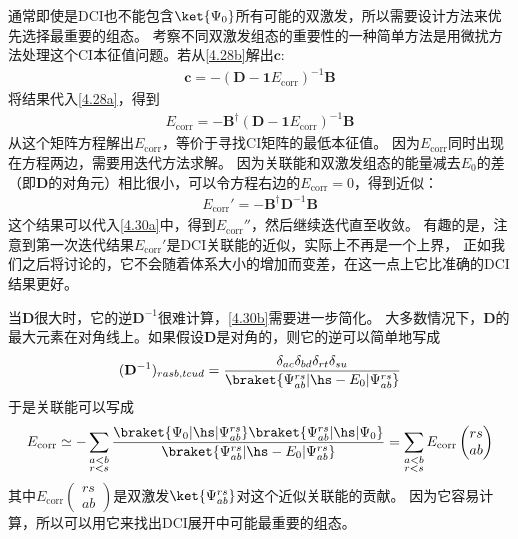 通常即使是DCI也不能包含$\ket{\Psi_0}$所有可能的双激发，所以需要设计方法来优先选择最重要的组态。
考察不同双激发组态的重要性的一种简单方法是用微扰方法处理这个CI本征值问题。若从\autoref{4.28b}解出$\mathbf{c}$:
\begin{align}
	\mathbf{c}=-(\mathbf{D}-\mathbf{1}E_{\text{corr}})^{-1}\mathbf{B}
\end{align}
将结果代入\autoref{4.28a}，得到
\begin{align}
	E_{\text{corr}}=-\mathbf{B}^\dagger(\mathbf{D}-\mathbf{1}E_{\text{corr}})^{-1}\mathbf{B}
\end{align}
从这个矩阵方程解出$E_{\text{corr}}$，等价于寻找CI矩阵的最低本征值。
因为$E_{\text{corr}}$同时出现在方程两边，需要用迭代方法求解。
因为关联能和双激发组态的能量减去$E_0$的差（即$\mathbf{D}$的对角元）相比很小，可以令方程右边的$E_{\text{corr}}=0$，得到近似：
\begin{align}
	E_{\text{corr}}'=-\mathbf{B}^\dagger\mathbf{D}^{-1}\mathbf{B}
\end{align}
这个结果可以代入\autoref{4.30a}中，得到$E_{\text{corr}}''$，然后继续迭代直至收敛。
有趣的是，注意到第一次迭代结果$E_{\text{corr}}'$是DCI关联能的近似，实际上不再是一个上界，
正如我们之后将讨论的，它不会随着体系大小的增加而变差，在这一点上它比准确的DCI结果更好。

当$\mathbf{D}$很大时，它的逆$\mathbf{D}^{-1}$很难计算，\autoref{4.30b}需要进一步简化。
大多数情况下，$\mathbf{D}$的最大元素在对角线上。如果假设$\mathbf{D}$是对角的，则它的逆可以简单地写成
\begin{align}
	(\mathbf{D}^{-1})_{rasb, tcud}=\frac{\delta_{ac}\delta_{bd}\delta_{rt}\delta_{su}}{\braket{\Psi^{rs}_{ab}|\hs-E_0|\Psi^{rs}_{ab}}}
\end{align}
于是关联能可以写成
\begin{align}
	E_{\text{corr}}\simeq -\sum_{\substack{a<b\\r<s}}\frac{\braket{\Psi_0|\hs|\Psi^{rs}_{ab}}\braket{\Psi^{rs}_{ab}|\hs|\Psi_0}}{\braket{\Psi^{rs}_{ab}|\hs-E_0|\Psi^{rs}_{ab}}}
	=\sum_{\substack{a<b\\r<s}}E_{\text{corr}}
	\begin{pmatrix}
		rs\\ab
	\end{pmatrix}
\end{align}
其中$E_{\text{corr}}
\begin{pmatrix}
	rs\\ab
\end{pmatrix}$是双激发$\ket{\Psi^{rs}_{ab}}$对这个近似关联能的贡献。
因为它容易计算，所以可以用它来找出DCI展开中可能最重要的组态。
